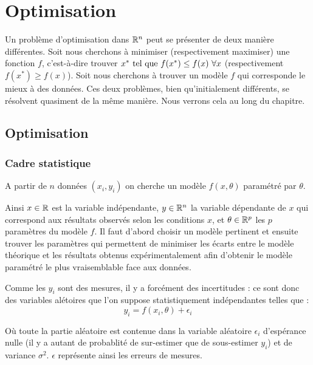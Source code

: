 \chapter{Optimisation}
\label{ch-5}

	
		Un problème d'optimisation dans $\mathbb{R}^n$ peut se présenter de deux manière différentes.
		Soit nous cherchons à minimiser (respectivement maximiser) une fonction $f$, c'est-à-dire trouver $x^* \text{ tel que } f(x^*) \leq f(x) ~\forall x$ (respectivement $f(x^*)\geq f(x) $).
		Soit nous cherchons à trouver un modèle $f$ qui corresponde le mieux à des données. Ces deux problèmes, bien qu'initialement différents, se résolvent quasiment de la même manière. Nous verrons cela au long du chapitre. 

\section{Optimisation}

	\subsection{Cadre statistique}
		A partir de $n$ données $(x_i, y_i)$ on cherche un modèle $f(x, \theta)$ paramétré par $\theta$.

		Ainsi $x \in \mathbb{R}$ est la variable indépendante, $y \in \mathbb{R}^n$ la variable dépendante de $x$ qui correspond aux résultats observés selon les conditions $x$, et $\theta \in \mathbb{R}^p$ les $p$ paramètres du modèle $f$.
		Il faut d'abord choisir un modèle pertinent et ensuite trouver les paramètres qui permettent de minimiser les écarts entre le modèle théorique et les résultats obtenus expérimentalement afin d'obtenir le modèle paramétré le plus vraisemblable face aux données.

		Comme les $y_i$ sont des mesures, il y a forcément des incertitudes : ce sont donc des variables alétoires que l'on suppose statistiquement indépendantes telles que :
		\begin{equation}
			\label{eq-5-yiEpsilon}
			y_i = f(x_i, \theta) + \epsilon_i
		\end{equation}
		
		Où toute la partie aléatoire est contenue dans la variable aléatoire $\epsilon_i$ d'espérance nulle (il y a autant de probablité de sur-estimer que de sous-estimer $y_i$) et de variance $\sigma^2$. $\epsilon$ représente ainsi les erreurs de mesures.


